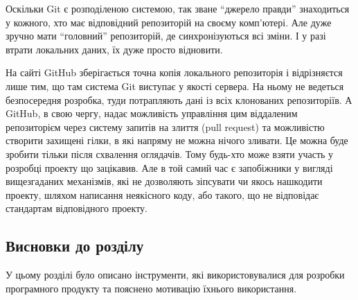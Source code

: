 Оскільки Git є розподіленою системою, так зване ``джерело правди'' знаходиться у кожного,
хто має відповідний репозиторій на своєму комп'ютері. Але дуже зручно мати ``головний''
репозиторій, де синхронізуються всі зміни. І у разі втрати локальних даних, їх дуже просто
відновити.

На сайті GitHub зберігається точна копія локального репозиторія і відрізняєтся лише тим,
що там система Git виступає у якості сервера. На ньому не ведеться безпосередня розробка,
туди потрапляють дані із всіх клонованих репозиторіїв. А GitHub, в свою чергу, надає
можливість управління цим віддаленим репозиторієм через систему запитів на злиття
(pull request) та можливістю створити захищені гілки, в які напряму не можна нічого
зливати. Це можна буде зробити тільки після схвалення оглядачів. Тому будь-хто може
взяти участь у розробці проекту що зацікавив. Але в той самий час є запобіжники у
вигляді вищезгаданих механізмів, які не дозволяють зіпсувати чи якось нашкодити
проекту, шляхом написання неякісного коду, або такого, що не відповідає стандартам
відповідного проекту.

\subsection*{Висновки до розділу }
У цьому розділі було описано інструменти, які використовувалися для розробки
програмного продукту та пояснено мотивацію їхнього використання.